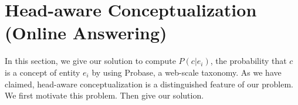 \section{Head-aware Conceptualization (Online Answering)}
\label{sec:conceptualization}
In this section, we give our solution to compute $P(c|e_i)$, the probability that $c$ is a concept of entity $e_i$ by using \ac{Probase}, a web-scale taxonomy.
As we have claimed, head-aware conceptualization is a distinguished feature of our problem.
We first motivate this problem. Then give our solution.

%
%
%


